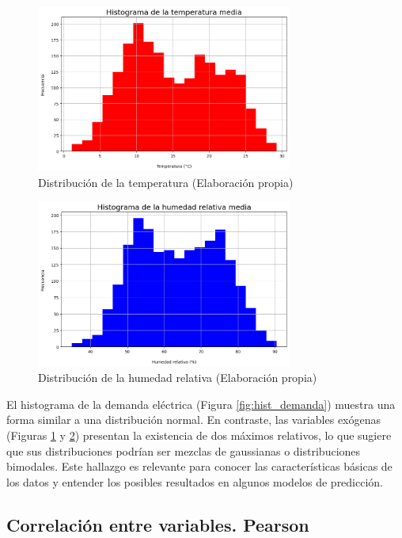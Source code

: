 \documentclass[12pt,a4paper]{report}
\begin{document}
\begin{figure}[H]
    \centering
    \includegraphics[width=0.75\textwidth]{Images/tfm-3.1B.png}
    \caption{Distribución de la temperatura (Elaboración propia)}
    \label{fig:hist_temp}
\end{figure}

\begin{figure}[H]
    \centering
    \includegraphics[width=0.75\textwidth]{Images/tfm-3.1C.png}
    \caption{Distribución de la humedad relativa (Elaboración propia)}
    \label{fig:hist_humedad}
\end{figure}

El histograma de la demanda eléctrica (Figura \ref{fig:hist_demanda}) muestra una forma similar a una distribución normal. En contraste, las variables exógenas (Figuras \ref{fig:hist_temp} y \ref{fig:hist_humedad}) presentan la existencia de dos máximos relativos, lo que sugiere que sus distribuciones podrían ser mezclas de gaussianas o distribuciones bimodales. Este hallazgo es relevante para conocer las características básicas de los datos y entender los posibles resultados en algunos modelos de predicción. 

\subsection{Correlación entre variables. Pearson}
\end{document}
